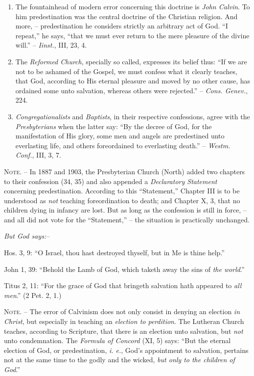 \documentclass[
]{book}
\begin{document}
\begin{enumerate}
\def\labelenumi{\arabic{enumi}.}
\item
  The fountainhead of modern error concerning this doctrine is \emph{John Calvin}. To him predestination was the central doctrine of the Christian religion. And more, -- predestination he considers strictly an arbitrary act of God. ``I repeat,'' he says, ``that we must ever return to the mere pleasure of the divine will.'' -- \emph{Iinst.}, III, 23, 4.
\item
  The \emph{Reformed Church}, specially so called, expresses its belief thus: ``If we are not to be ashamed of the Gospel, we must confess what it clearly teaches, that God, according to His eternal pleasure and moved by no other cause, has ordained some unto salvation, whereas others were rejected.'' -- \emph{Cons. Genev.}, 224.
\item
  \emph{Congregationalists} and \emph{Baptists}, in their respective confessions, agree with the \emph{Presbyterians} when the latter say: ``By the decree of God, for the manifestation of His glory, some men and angels are predestined unto everlasting life, and others foreordained to everlasting death.'' -- \emph{Westm. Conf.}, III, 3, 7.
\end{enumerate}

\textsc{Note.} -- In 1887 and 1903, the Presbyterian Church (North) added two chapters to their confession (34, 35) and also appended a \emph{Declaratory Statement} concerning predestination. According to this ``Statement,'' Chapter III is to be understood as \emph{not} teaching foreordination to death; and Chapter X, 3, that no children dying in infancy are lost. But as long as the confession is still in force, -- and all did not vote for the ``Statement,'' -- the situation is practically unchanged.

\begin{center}
\textsl{But God says:--}
\end{center}

Hos. 3, 9: ``O Israel, thou hast destroyed thyself, but in Me is thine help.''

John 1, 39: ``Behold the Lamb of God, which taketh away the sins of \emph{the world}.''

Titus 2, 11: ``For the grace of God that bringeth salvation hath appeared to \emph{all men}.'' (2 Pet. 2, 1.)

\textsc{Note.} -- The error of Calvinism does not only consist in denying an election \emph{in Christ}, but especially in teaching an \emph{election to perdition}. The Lutheran Church teaches, according to Scripture, that there is an election unto salvation, but \emph{not} unto condemnation. The \emph{Formula of Concord} (XI, 5) says: ``But the eternal election of God, or predestination, \emph{i. e.}, God's appointment to salvation, pertains not at the same time to the godly and the wicked, \emph{but only to the children of God}.''
\end{document}
